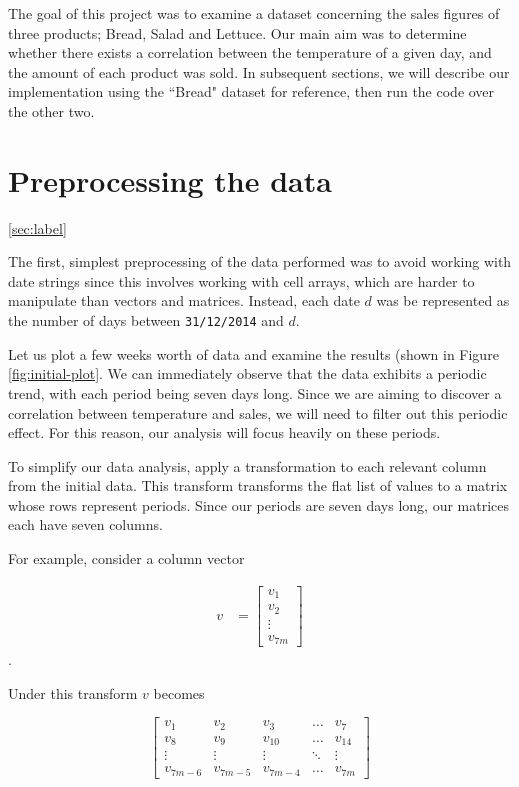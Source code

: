 The goal of this project was to examine a dataset concerning the sales figures of three products; Bread, Salad and Lettuce. Our main aim was to determine whether there exists a correlation between the temperature of a given day, and the amount of each product was sold. In subsequent sections, we will describe our implementation using the ``Bread" dataset for reference, then run the code over the other two.

\section{Preprocessing the data}\ref{sec:label}

The first, simplest preprocessing of the data performed was to avoid working with date strings since this involves working with cell arrays, which are harder to manipulate than vectors and matrices. Instead, each date $d$ was be represented as the number of days between \texttt{31/12/2014} and $d$.

Let us plot a few weeks worth of data and examine the results (shown in Figure \ref{fig:initial-plot}. We can immediately observe that the data exhibits a periodic trend, with each period being seven days long. Since we are aiming to discover a correlation between temperature and sales, we will need to filter out this periodic effect. For this reason, our analysis will focus heavily on these periods.

To simplify our data analysis, apply a transformation to each relevant column from the initial data. This transform transforms the flat list of values to a matrix whose rows represent periods. Since our periods are seven days long, our matrices each have seven columns.

For example, consider a column vector 

\begin{align}
   v &= \begin{bmatrix}
           v_{1} \\
           v_{2} \\
           \vdots \\
           v_{7m}
         \end{bmatrix}
  \end{align}.

Under this transform $v$ becomes

\[
\begin{bmatrix}
    v_{1} & v_{2} & v_{3} & \dots  & v_{7} \\
    v_{8} & v_{9} & v_{10} & \dots  & v_{14} \\
    \vdots & \vdots & \vdots & \ddots & \vdots \\
    v_{7m-6} & v_{7m-5} & v_{7m -4} & \dots  & v_{7m}
\end{bmatrix}
\]

